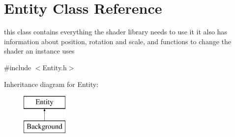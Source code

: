 \hypertarget{class_entity}{\section{Entity Class Reference}
\label{class_entity}
}


this class contains everything the shader library needs to use it it also has information about position, rotation and scale, and functions to change the shader an instance uses  




{\ttfamily \#include $<$Entity.\-h$>$}

Inheritance diagram for Entity\-:\begin{figure}[H]
\begin{center}
\leavevmode
\includegraphics[height=2.000000cm]{class_entity}
\end{center}
\end{figure}
